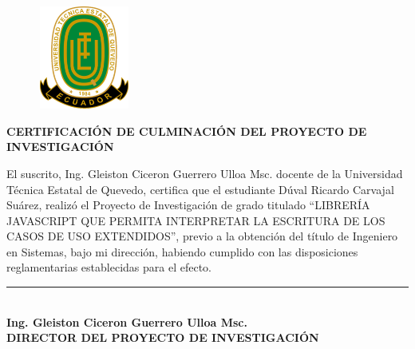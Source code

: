\begin{center}
	\begin{figure}[htb]
		\begin{center}
			\includegraphics[width=3.04cm,height=3.39cm]{img/logoUTEQ.png}
		\end{center}
	\end{figure}
	
{\titulodc \textbf{CERTIFICACIÓN DE CULMINACIÓN DEL PROYECTO DE INVESTIGACIÓN}}

\end{center}
\vspace*{0.8in}
El suscrito, Ing. Gleiston Ciceron Guerrero Ulloa Msc. docente de la Universidad Técnica Estatal de Quevedo, certifica que el estudiante Dúval Ricardo Carvajal Suárez, realizó el Proyecto de Investigación de grado titulado “LIBRERÍA JAVASCRIPT QUE PERMITA INTERPRETAR LA ESCRITURA DE LOS CASOS DE USO EXTENDIDOS”, previo a la obtención del título de Ingeniero en Sistemas, bajo mi dirección, habiendo cumplido con las disposiciones reglamentarias establecidas para el efecto.

\begin{center}
	\vspace*{2in}
	\rule{8cm}{0.1mm} \\
	\textbf{Ing. Gleiston Ciceron Guerrero Ulloa Msc. \\
		DIRECTOR DEL PROYECTO DE INVESTIGACIÓN}
\end{center}